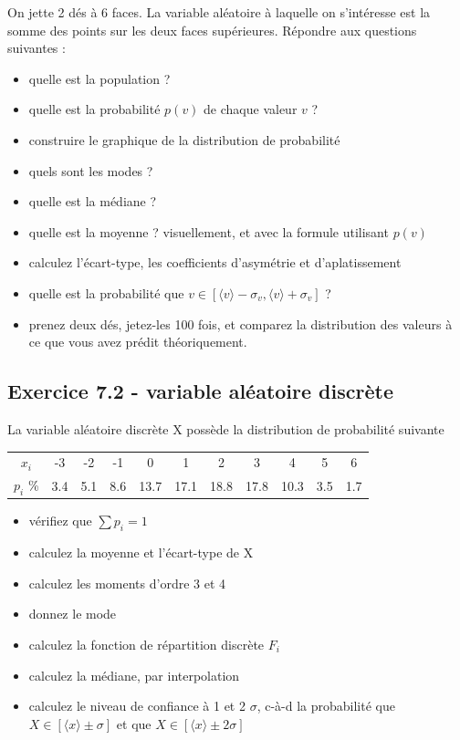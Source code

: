 On jette 2 dés à 6 faces. La variable aléatoire à laquelle on s'intéresse est la somme des points sur les deux faces supérieures. Répondre aux questions suivantes :
\begin{itemize}
\item quelle est la population ?
\item quelle est la probabilité $p(v)$ de chaque valeur $v$ ?
\item construire le graphique de la distribution de probabilité
\item quels sont les modes ?
\item quelle est la médiane ?
\item quelle est la moyenne ? visuellement, et avec la formule utilisant $p(v)$
\item calculez l'écart-type, les coefficients d'asymétrie et d'aplatissement
\item quelle est la probabilité que $v\in[\langle v \rangle-\sigma_v,\langle v \rangle+\sigma_v]$ ?
\item prenez deux dés, jetez-les 100 fois, et comparez la distribution des valeurs à ce que vous avez prédit théoriquement.
\end{itemize}

\subsection*{Exercice 7.2 - variable aléatoire discrète}

La variable aléatoire discrète X possède la distribution de probabilité suivante
\begin{center}
\begin{tabular}{c|cccccccccc}
$x_i$    &  -3 &   -2 &   -1 &    0 & 1    & 2    & 3    & 4    & 5   & 6\\
$p_i$ \% & 3.4 & 5.1 & 8.6 & 13.7 & 17.1 & 18.8 & 17.8 & 10.3 & 3.5 & 1.7
\end{tabular}
\end{center}
\begin{itemize}
\item vérifiez que $\sum p_i=1$
\item calculez la moyenne et l'écart-type de X
\item calculez les moments d'ordre 3 et 4
\item donnez le mode
\item calculez la fonction de répartition discrète $F_i$
\item calculez la médiane, par interpolation
\item calculez le niveau de confiance à 1 et 2 $\sigma$, c-à-d la probabilité que $X\in[\langle x\rangle\pm\sigma]$ et que $X\in[\langle x\rangle\pm2\sigma]$
\end{itemize}

